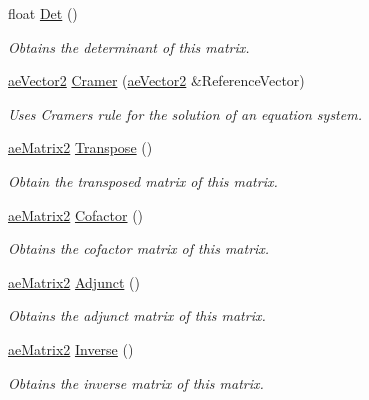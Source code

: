 \begin{DoxyCompactItemize}
\item 
float \hyperlink{structae_core_1_1ae_matrix2_a21754da48aa2b7d62b3671df9ad857d9}{Det} ()
\begin{DoxyCompactList}\small\item\em Obtains the determinant of this matrix. \end{DoxyCompactList}\item 
\hyperlink{structae_core_1_1ae_vector2}{ae\+Vector2} \hyperlink{structae_core_1_1ae_matrix2_a56a2ed15734c12e6758e24e5b99e320b}{Cramer} (\hyperlink{structae_core_1_1ae_vector2}{ae\+Vector2} \&Reference\+Vector)
\begin{DoxyCompactList}\small\item\em Uses Cramer\textquotesingle{}s rule for the solution of an equation system. \end{DoxyCompactList}\item 
\hyperlink{structae_core_1_1ae_matrix2}{ae\+Matrix2} \hyperlink{structae_core_1_1ae_matrix2_adb256aaa0254d5d5a39b15922459617c}{Transpose} ()
\begin{DoxyCompactList}\small\item\em Obtain the transposed matrix of this matrix. \end{DoxyCompactList}\item 
\hyperlink{structae_core_1_1ae_matrix2}{ae\+Matrix2} \hyperlink{structae_core_1_1ae_matrix2_afc3bfb3199e6250d07b87e2753c72ffe}{Cofactor} ()
\begin{DoxyCompactList}\small\item\em Obtains the cofactor matrix of this matrix. \end{DoxyCompactList}\item 
\hyperlink{structae_core_1_1ae_matrix2}{ae\+Matrix2} \hyperlink{structae_core_1_1ae_matrix2_a9562f29192a261d3bb08d638d01a8668}{Adjunct} ()
\begin{DoxyCompactList}\small\item\em Obtains the adjunct matrix of this matrix. \end{DoxyCompactList}\item 
\hyperlink{structae_core_1_1ae_matrix2}{ae\+Matrix2} \hyperlink{structae_core_1_1ae_matrix2_a190c5cf6cd89327845f57be611243c13}{Inverse} ()
\begin{DoxyCompactList}\small\item\em Obtains the inverse matrix of this matrix. \end{DoxyCompactList}\end{DoxyCompactItemize}
